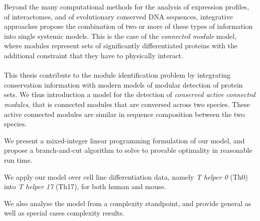 Beyond the many computational methods for the analysis of expression profiles, of interactomes, and of evolutionary conserved DNA sequences, integrative approaches propose the combination of two or more of these types of information into single systemic models.
This is the case of the \emph{connected module} model, where modules represent sets of significantly differentiated proteins with the additional constraint that they have to physically interact.

\paragraph{}

This thesis contribute to the module identification problem by integrating conservation information with modern models of modular detection of protein sets.
We thus introduction a model for the detection of \emph{conserved active connected modules}, that is connected modules that are conversed across two species.
These active connected modules are similar in sequence composition between the two species.

We present a mixed-integer linear programming formulation of our model, and propose a branch-and-cut algorithm to solve to provable optimality in reasonable run time.

We apply our model over cell line differentiation data, namely \emph{T helper 0} (Th0) into \emph{T helper 17} (Th17), for both human and mouse.

We also analyse the model from a complexity standpoint, and provide general as well as special cases complexity results.
